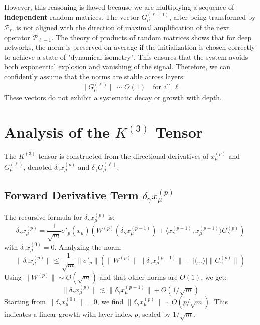\documentclass[a4paper]{article}
\begin{document}
However, this reasoning is flawed because we are multiplying a sequence of \textbf{independent} random matrices. The vector $G^{(\ell+1)}_\mu$, after being transformed by $\mathcal{P}_\ell$, is not aligned with the direction of maximal amplification of the next operator $\mathcal{P}_{\ell-1}$. The theory of products of random matrices shows that for deep networks, the norm is preserved on average if the initialization is chosen correctly to achieve a state of "dynamical isometry". This ensures that the system avoids both exponential explosion and vanishing of the signal. Therefore, we can confidently assume that the norms are stable across layers:
\begin{equation}
    \|G^{(\ell)}_\mu\| \sim O(1) \quad \text{for all } \ell
\end{equation}
These vectors do not exhibit a systematic decay or growth with depth.

\section{Analysis of the $K^{(3)}$ Tensor}

The $K^{(3)}$ tensor is constructed from the directional derivatives of $x^{(p)}_\mu$ and $G^{(\ell)}_\mu$, denoted $\delta_\gamma x^{(p)}_\mu$ and $\delta_\gamma G^{(\ell)}_\mu$.

\subsection{Forward Derivative Term $\delta_\gamma x^{(p)}_\mu$}

The recursive formula for $\delta_\gamma x^{(p)}_\mu$ is:
\begin{equation}
    \delta_\gamma x^{(p)}_\mu = \frac{1}{\sqrt{m}} \sigma'_{p}(x_\mu) \left( W^{(p)} (\delta_\gamma x^{(p-1)}_\mu) + \langle x^{(p-1)}_\gamma, x^{(p-1)}_\mu \rangle G^{(p)}_\gamma \right)
\end{equation}
with $\delta_\gamma x^{(0)}_\mu = 0$. Analyzing the norm:
\begin{equation}
    \|\delta_\gamma x^{(p)}_\mu\| \le \frac{1}{\sqrt{m}} \|\sigma'_{p}\| \left( \|W^{(p)}\| \|\delta_\gamma x^{(p-1)}_\mu\| + |\langle \dots \rangle| \|G^{(p)}_\gamma\| \right)
\end{equation}
Using $\|W^{(p)}\| \sim O(\sqrt{m})$ and that other norms are $O(1)$, we get:
\begin{equation}
    \|\delta_\gamma x^{(p)}_\mu\| \lesssim \|\delta_\gamma x^{(p-1)}_\mu\| + O(1/\sqrt{m})
\end{equation}
Starting from $\|\delta_\gamma x^{(0)}_\mu\| = 0$, we find $\|\delta_\gamma x^{(p)}_\mu\| \sim O(p/\sqrt{m})$. This indicates a linear growth with layer index $p$, scaled by $1/\sqrt{m}$.
\end{document}
